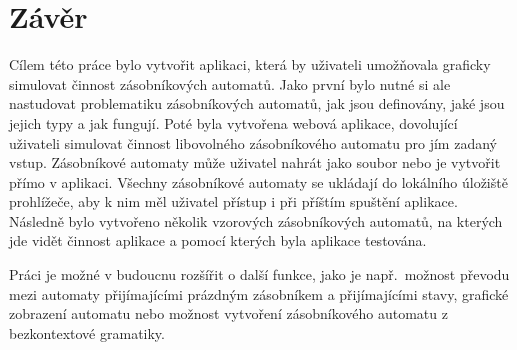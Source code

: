 \chapter{Závěr}\label{chap:Conclusion}

Cílem této práce bylo vytvořit aplikaci, která by uživateli umožňovala graficky simulovat činnost zásobníkových automatů. Jako první bylo nutné si ale nastudovat problematiku zásobníkových automatů, jak jsou definovány, jaké jsou jejich typy a jak fungují. Poté byla vytvořena webová aplikace, dovolující uživateli simulovat činnost libovolného zásobníkového automatu pro jím zadaný vstup. Zásobníkové automaty může uživatel nahrát jako soubor nebo je vytvořit přímo v aplikaci. Všechny zásobníkové automaty se ukládají do lokálního úložiště prohlížeče, aby k nim měl uživatel přístup i při příštím spuštění aplikace. Následně bylo vytvořeno několik vzorových zásobníkových automatů, na kterých jde vidět činnost aplikace a pomocí kterých byla aplikace testována.

Práci je možné v budoucnu rozšířit o další funkce, jako je např.\ možnost převodu mezi automaty přijímajícími prázdným zásobníkem a přijímajícími stavy, grafické zobrazení automatu nebo možnost vytvoření zásobníkového automatu z bezkontextové gramatiky.
\endinput